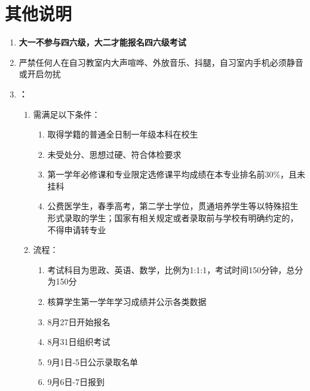 \section[其他说明]{其他说明}
\begin{enumerate}
      \item \textbf{大一不参与四六级，大二才能报名四六级考试}
      \item 严禁任何人在自习教室内大声喧哗、外放音乐、抖腿，自习室内手机必须静音或开启勿扰
      \item \textbf{\footnotemark：}
            \begin{enumerate}
                  \item 需满足以下条件：
                        \begin{enumerate}
                              \item 取得学籍的普通全日制一年级本科在校生
                              \item 未受处分、思想过硬、符合体检要求
                              \item 第一学年必修课和专业限定选修课平均成绩在本专业排名前30\%，且未挂科
                              \item 公费医学生，春季高考，第二学士学位，贯通培养学生等以特殊招生形式录取的学生；国家有相关规定或者录取前与学校有明确约定的，不得申请转专业
                        \end{enumerate}
                  \item 流程：
                        \begin{enumerate}
                              \item 考试科目为思政、英语、数学，比例为1:1:1，考试时间150分钟，总分为150分
                              \item 核算学生第一学年学习成绩并公示各类数据
                              \item 8月27日开始报名
                              \item 8月31日组织考试
                              \item 9月1日-5日公示录取名单\footnotemark
                              \item 9月6日-7日报到

\end{enumerate}
\end{enumerate}
\end{enumerate}
